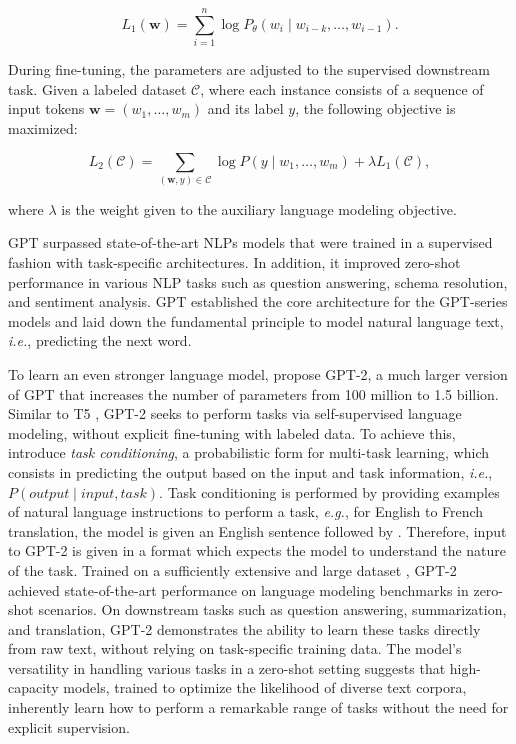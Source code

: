 \begin{equation}
    L_1(\bm{w}) = \sum_{i=1}^n \log P_{\theta}(w_i \mid w_{i-k}, \ldots, w_{i-1}).
\end{equation}

\noindent During fine-tuning, the parameters are adjusted to the supervised downstream task. Given a labeled dataset $\mathcal{C}$, where each instance consists of a sequence of input tokens $\bm{w} = (w_1, \ldots, w_m)$ and its label $y$, the following objective is maximized:

\begin{equation}
    L_2(\mathcal{C}) = \sum_{(\bm{w}, y) \in \mathcal{C}} \log P(y \mid w_1, \ldots, w_m) + \lambda L_1(\mathcal{C}),
\end{equation}

\noindent where $\lambda$ is the weight given to the auxiliary language modeling objective.

\noindent \ac{GPT} surpassed state-of-the-art \acp{NLP} models that were trained in a supervised fashion with task-specific architectures. In addition, it improved zero-shot performance in various \ac{NLP} tasks such as question answering, schema resolution, and sentiment analysis. \ac{GPT} established the core architecture for the \ac{GPT}-series models and laid down the fundamental principle to model natural language text, \textit{i.e.}, predicting the next word.

To learn an even stronger language model, \citet{radford2019language} propose \ac{GPT}-2, a much larger version of \ac{GPT} that increases the number of parameters from 100 million to 1.5 billion. Similar to T5 \citep{raffel2020exploring}, \ac{GPT}-2 seeks to perform tasks via self-supervised language modeling, without explicit fine-tuning with labeled data. To achieve this, \citet{radford2019language} introduce \textit{task conditioning}, a probabilistic form for multi-task learning, which consists in predicting the output based on the input and task information, \textit{i.e.}, $P(output \mid input, task)$. Task conditioning is performed by providing examples of natural language instructions to perform a task, \textit{e.g.}, for English to French translation, the model is given an English sentence followed by . Therefore, input to \ac{GPT}-2 is given in a format which expects the model to understand the nature of the task. Trained on a sufficiently extensive and large dataset \citep{radford2019language}, \ac{GPT}-2 achieved state-of-the-art performance on language modeling benchmarks \citep{marcus1993building, chelba2013one, merity2016pointer} in zero-shot scenarios. On downstream tasks such as question answering, summarization, and translation, \ac{GPT}-2 demonstrates the ability to learn these tasks directly from raw text, without relying on task-specific training data. The model's versatility in handling various tasks in a zero-shot setting suggests that high-capacity models, trained to optimize the likelihood of diverse text corpora, inherently learn how to perform a remarkable range of tasks without the need for explicit supervision.


